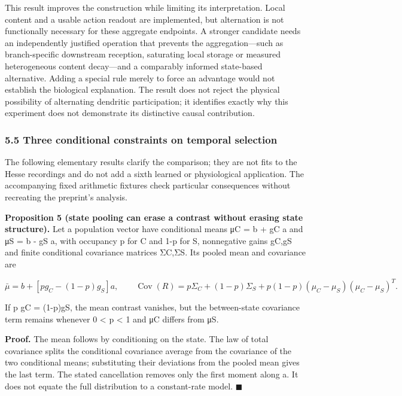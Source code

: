 \documentclass[
  american,
  11pt,
  letterpaper,
]{article}
\begin{document}
This result improves the construction while limiting its interpretation. Local content and a usable action readout are implemented, but alternation is not functionally necessary for these aggregate endpoints. A stronger candidate needs an independently justified operation that prevents the aggregation---such as branch-specific downstream reception, saturating local storage or measured heterogeneous content decay---and a comparably informed state-based alternative. Adding a special rule merely to force an advantage would not establish the biological explanation. The result does not reject the physical possibility of alternating dendritic participation; it identifies exactly why this experiment does not demonstrate its distinctive causal contribution.

\subsubsection{5.5 Three conditional constraints on temporal selection}\label{three-conditional-constraints-on-temporal-selection}

The following elementary results clarify the comparison; they are not fits to the Hesse recordings and do not add a sixth learned or physiological application. The accompanying fixed arithmetic fixtures check particular consequences without recreating the preprint's analysis.

\textbf{Proposition 5 (state pooling can erase a contrast without erasing state structure).} Let a population vector have conditional means μC = b + gC a and μS = b - gS a, with occupancy p for C and 1-p for S, nonnegative gains gC,gS and finite conditional covariance matrices ΣC,ΣS. Its pooled mean and covariance are

\[
\bar\mu=b+[p g_C-(1-p)g_S]a,\qquad
\operatorname{Cov}(R)=p\Sigma_C+(1-p)\Sigma_S+p(1-p)(\mu_C-\mu_S)(\mu_C-\mu_S)^T. \tag{9}
\]

If p gC = (1-p)gS, the mean contrast vanishes, but the between-state covariance term remains whenever 0 \textless{} p \textless{} 1 and μC differs from μS.

\textbf{Proof.} The mean follows by conditioning on the state. The law of total covariance splits the conditional covariance average from the covariance of the two conditional means; substituting their deviations from the pooled mean gives the last term. The stated cancellation removes only the first moment along a. It does not equate the full distribution to a constant-rate model. \(\blacksquare\)
\end{document}
